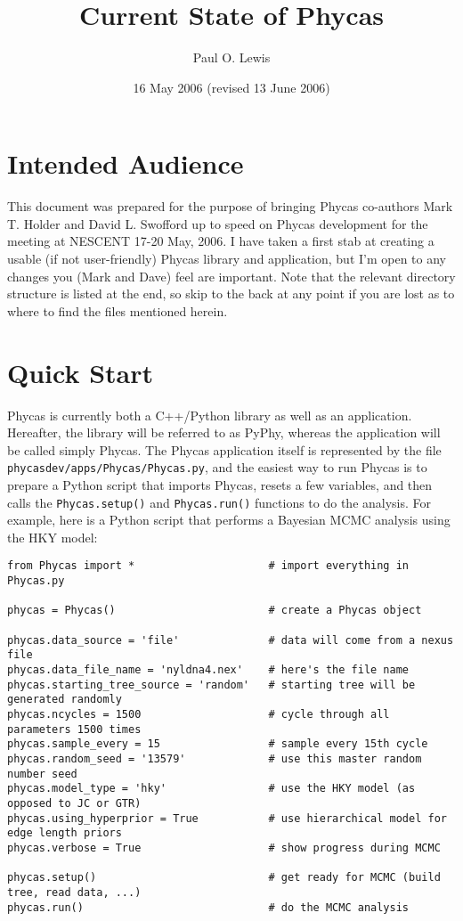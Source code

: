 \documentclass[10pt]{article}
\begin{document}
\title{Current State of Phycas}
\author{Paul O. Lewis} 
\date{16 May 2006 (revised 13 June 2006)}
\maketitle

\section{Intended Audience}

This document was prepared for the purpose of bringing Phycas co-authors Mark T. Holder and David L. Swofford up to speed on Phycas development for the meeting at NESCENT 17-20 May, 2006. I have taken a first stab at creating a usable (if not user-friendly) Phycas library and application, but I'm open to any changes you (Mark and Dave) feel are important. Note that the relevant directory structure is listed at the end, so skip to the back at any point if you are lost as to where to find the files mentioned herein.

\section{Quick Start}

Phycas is currently both a C++/Python library as well as an application. Hereafter, the library will be referred to as PyPhy, whereas the application will be called simply Phycas. The Phycas application itself is represented by the file {\tt phycasdev/apps/Phycas/Phycas.py}, and the easiest way to run Phycas is to prepare a Python script that imports Phycas, resets a few variables, and then calls the \verb+Phycas.setup()+ and \verb+Phycas.run()+ functions to do the analysis. For example, here is a Python script that performs a Bayesian MCMC analysis using the HKY model:

\begin{verbatim}
from Phycas import *                     # import everything in Phycas.py

phycas = Phycas()                        # create a Phycas object

phycas.data_source = 'file'              # data will come from a nexus file
phycas.data_file_name = 'nyldna4.nex'    # here's the file name
phycas.starting_tree_source = 'random'   # starting tree will be generated randomly
phycas.ncycles = 1500                    # cycle through all parameters 1500 times
phycas.sample_every = 15                 # sample every 15th cycle
phycas.random_seed = '13579'             # use this master random number seed
phycas.model_type = 'hky'                # use the HKY model (as opposed to JC or GTR)
phycas.using_hyperprior = True           # use hierarchical model for edge length priors
phycas.verbose = True                    # show progress during MCMC

phycas.setup()                           # get ready for MCMC (build tree, read data, ...)
phycas.run()                             # do the MCMC analysis
\end{verbatim}
\end{document}
